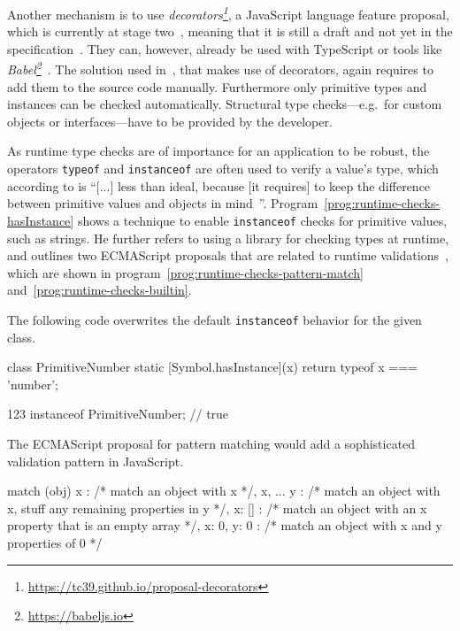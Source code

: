 Another mechanism is to use \textit{decorators\footnote{\url{https://tc39.github.io/proposal-decorators}}},
a JavaScript language feature proposal, which is currently at stage two~\cite{DecoratorsProposalRepo}, meaning that it is still a draft and not yet in the specification~\cite{EcmaScriptProposalProcess}. They can, however, already be used with TypeScript or tools like \emph{Babel\footnote{\url{https://babeljs.io}}}~\cite{TypeScriptHandbook:Decorators, Babel:Plugins:Decorators}.
The solution used in~\cite{DecoratorTypeChecks}, that makes use of decorators, again requires
to add them to the source code manually. Furthermore only primitive types and instances can be checked automatically. Structural type checks---e.g.\ for custom objects or interfaces---have
to be provided by the developer.

As runtime type checks are of importance for an application to be robust, the operators \texttt{typeof} and \texttt{instanceof} are often used to verify a value's type, which according to \citeauthor{DynamicTypeChecks:Rauschmayer:2017} is ``[...] less than ideal, because [it requires] to keep the difference between primitive values and objects in mind~\cite{DynamicTypeChecks:Rauschmayer:2017}''. Program~\ref{prog:runtime-checks-hasInstance} shows a technique to enable \texttt{instanceof} checks for primitive values, such as strings. He further refers to using a library for checking types at runtime, and outlines two ECMAScript proposals that are related to runtime validations~\cite{DynamicTypeChecks:Rauschmayer:2017}, which are shown in program~\ref{prog:runtime-checks-pattern-match} and~\ref{prog:runtime-checks-builtin}.

\begin{program}
\caption{The following code overwrites the default \texttt{instanceof} behavior for the given class.~\cites{DynamicTypeChecks:Rauschmayer:2017, DynamicTypeChecks:hasInstance}}
\label{prog:runtime-checks-hasInstance}
\begin{JsCode}
class PrimitiveNumber {
  static [Symbol.hasInstance](x) {
    return typeof x === 'number';
  }
}

123 instanceof PrimitiveNumber; // true
\end{JsCode}
\end{program}

\begin{program}
\caption{The ECMAScript proposal for pattern matching would add a sophisticated validation pattern in JavaScript.~\cites{DynamicTypeChecks:Rauschmayer:2017, PatternMatchingProposalRepo}}
\label{prog:runtime-checks-pattern-match}
\begin{JsCode}
match (obj) {
  { x }: /* match an object with x */,
  { x, ... y }: /* match an object with x, stuff any remaining properties in y */,
  { x: [] }: /* match an object with an x property that is an empty array */,
  { x: 0, y: 0 }: /* match an object with x and y properties of 0 */
}
\end{JsCode}
\end{program}

